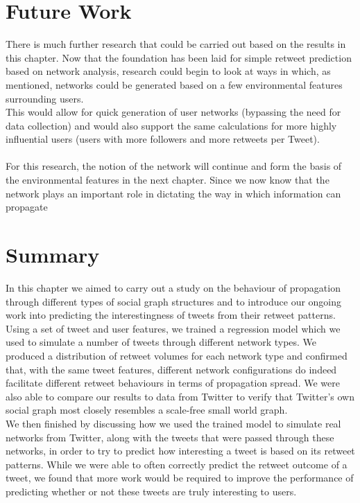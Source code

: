 \section{Future Work}
There is much further research that could be carried out based on the results in this chapter. Now that the foundation has been laid for simple retweet prediction based on network analysis, research could begin to look at ways in which, as mentioned, networks could be generated based on a few environmental features surrounding users.
\\
This would allow for quick generation of user networks (bypassing the need for data collection) and would also support the same calculations for more highly influential users (users with more followers and more retweets per Tweet).
\\ \\
For this research, the notion of the network will continue and form the basis of the environmental features in the next chapter. Since we now know that the network plays an important role in dictating the way in which information can propagate

\section{Summary}
In this chapter we aimed to carry out a study on the behaviour of propagation through different types of social graph structures and to introduce our ongoing work into predicting the interestingness of tweets from their retweet patterns.
\\
Using a set of tweet and user features, we trained a regression model which we used to simulate a number of tweets through different network types. We produced a distribution of retweet volumes for each network type and confirmed that, with the same tweet features, different network configurations do indeed facilitate different retweet behaviours in terms of propagation spread. We were also able to compare our results to data from Twitter to verify that Twitter's own social graph most closely resembles a scale-free small world graph.
\\
We then finished by discussing how we used the trained model to simulate real networks from Twitter, along with the tweets that were passed through these networks, in order to try to predict how interesting a tweet is based on its retweet patterns. While we were able to often correctly predict the retweet outcome of a tweet, we found that more work would be required to improve the performance of predicting whether or not these tweets are truly interesting to users.
